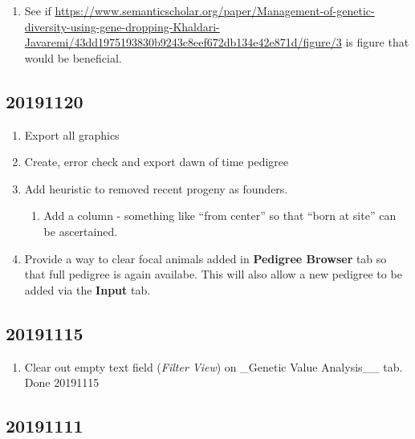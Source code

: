 \documentclass[
]{article}
\providecommand{\tightlist}{%
  \setlength{\itemsep}{0pt}\setlength{\parskip}{0pt}}
\begin{document}
\begin{enumerate}
\def\labelenumi{\arabic{enumi}.}
\tightlist
\item
  See if
  \url{https://www.semanticscholar.org/paper/Management-of-genetic-diversity-using-gene-dropping-Khaldari-Javaremi/43dd1975193830b9243c8eef672db134e42e871d/figure/3}
  is figure that would be beneficial.
\end{enumerate}

\hypertarget{section-3}{%
\subsection{20191120}\label{section-3}}

\begin{enumerate}
\def\labelenumi{\arabic{enumi}.}
\tightlist
\item
  Export all graphics
\item
  Create, error check and export dawn of time pedigree
\item
  Add heuristic to removed recent progeny as founders.

  \begin{enumerate}
  \def\labelenumii{\alph{enumii}.}
  \tightlist
  \item
    Add a column - something like ``from center'' so that ``born at
    site'' can be ascertained.
  \end{enumerate}
\item
  Provide a way to clear focal animals added in \textbf{Pedigree
  Browser} tab so that full pedigree is again availabe. This will also
  allow a new pedigree to be added via the \textbf{Input} tab.
\end{enumerate}

\hypertarget{section-4}{%
\subsection{20191115}\label{section-4}}

\begin{enumerate}
\def\labelenumi{\arabic{enumi}.}
\tightlist
\item
  Clear out empty text field (\emph{Filter View}) on \_Genetic Value
  Analysis\_\_ tab. Done 20191115
\end{enumerate}

\hypertarget{section-5}{%
\subsection{20191111}\label{section-5}}
\end{document}
